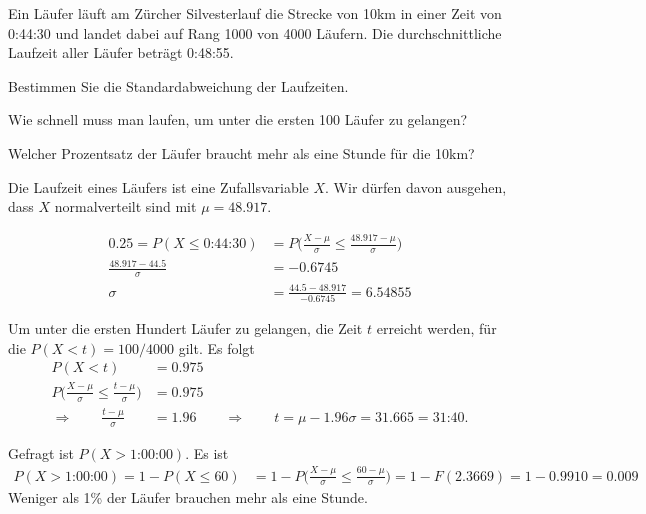 Ein Läufer läuft am Zürcher Silvesterlauf die Strecke von 10km in
einer Zeit von 0:44:30 und landet dabei auf Rang 1000 von 4000 Läufern.
Die durchschnittliche Laufzeit aller Läufer beträgt 0:48:55.
\begin{teilaufgaben}
\item 
Bestimmen Sie die Standardabweichung der Laufzeiten.
\item
Wie schnell muss man laufen, um unter die ersten 100 Läufer zu gelangen?
\item
Welcher Prozentsatz der Läufer braucht mehr als eine Stunde für die 10km?
\end{teilaufgaben}

\begin{loesung}
Die Laufzeit eines Läufers ist eine Zufallsvariable $X$.
Wir dürfen davon ausgehen, dass $X$ normalverteilt sind mit $\mu=48.917$.
\begin{teilaufgaben}
\item 
\begin{align*}
0.25
=
P(X \le \text{0:44:30})
&=
P\biggl(
\frac{X-\mu}{\sigma} \le \frac{48.917 - \mu}{\sigma}
\biggr)
\\
\frac{48.917 - 44.5}{\sigma}
&=
-0.6745
\\
\sigma
&=
\frac{44.5- 48.917}{-0.6745}
=
6.54855
\end{align*}
\item 
Um unter die ersten Hundert Läufer zu gelangen, die Zeit $t$ erreicht werden,
für die $P(X<t)=100/4000$ gilt.
Es folgt
\begin{align*}
P(X<t)
&=
0.975
\\
P\biggl(\frac{X-\mu}{\sigma}\le\frac{t-\mu}{\sigma}\biggr)
&=
0.975
\\
\Rightarrow\qquad
\frac{t-\mu}{\sigma}
&=
1.96
\qquad\Rightarrow\qquad
t=\mu - 1.96\sigma = 31.665 = \text{31:40}.
\end{align*}
\item
Gefragt ist $P(X>\text{1:00:00})$.
Es ist
\begin{align*}
P(X>\text{1:00:00})
=1-P(X\le 60)
&=
1- P\biggl(\frac{X-\mu}{\sigma} \le \frac{60-\mu}{\sigma}\biggr)
=
1 - F(2.3669)
=
1-0.9910=0.009
\end{align*}
Weniger als 1\% der Läufer brauchen mehr als eine Stunde.
\end{teilaufgaben}
\end{loesung}




